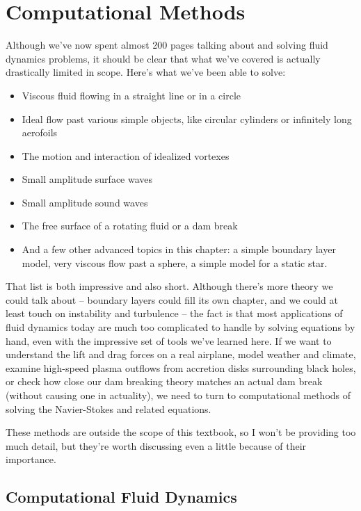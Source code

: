 %
% 

\section{Computational Methods}

Although we've now spent almost 200 pages talking about and solving fluid dynamics problems, it should be clear that what we've covered is actually drastically limited in scope.  Here's what we've been able to solve:
\begin{itemize}
\item Viscous fluid flowing in a straight line or in a circle
\item Ideal flow past various simple objects, like circular cylinders or infinitely long aerofoils
\item The motion and interaction of idealized vortexes
\item Small amplitude surface waves
\item Small amplitude sound waves
\item The free surface of a rotating fluid or a dam break
\item And a few other advanced topics in this chapter: a simple boundary layer model, very viscous flow past a sphere, a simple model for a static star.
\end{itemize}

That list is both impressive and also short.  Although there's more theory we could talk about -- boundary layers could fill its own chapter, and we could at least touch on instability and turbulence -- the fact is that most applications of fluid dynamics today are much too complicated to handle by solving equations by hand, even with the impressive set of tools we've learned here.  If we want to understand the lift and drag forces on a real airplane, model weather and climate, examine high-speed plasma outflows from accretion disks surrounding black holes, or check how close our dam breaking theory matches an actual dam break (without causing one in actuality), we need to turn to computational methods of solving the Navier-Stokes and related equations. 

These methods are outside the scope of this textbook, so I won't be providing too much detail, but they're worth discussing even a little because of their importance.  

\subsection{Computational Fluid Dynamics}

